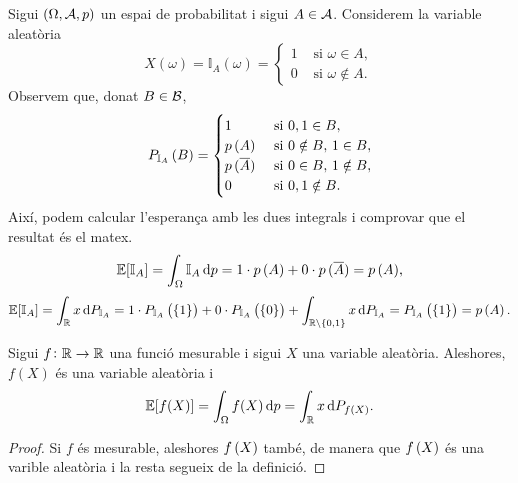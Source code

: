 \begin{example}
    Sigui $\left( \Omega, \mathcal{A}, p\right)$ un espai de probabilitat i sigui $A\in\mathcal{A}$. Considerem la variable aleatòria
    \[
        X(\omega) = \mathbb{I}_A(\omega) = \begin{cases}
        1&\text{ si } \omega\in A, \\
        0&\text{ si } \omega \notin A.
        \end{cases}
    \]
    Observem que, donat $B\in\mathcal{B}$,
    \[
        P_{\mathbb{I}_A}\left( B\right) = \begin{cases}
            1 &\text{ si } 0,1\in B,\\
            p\left( A\right) &\text{ si } 0\notin B,\, 1\in B,\\
            p\,( \overline{A}) &\text{ si } 0\in B,\, 1\notin B,\\
            0 & \text{ si } 0,1\notin B.
        \end{cases}
    \]
    Així, podem calcular l'esperança amb les dues integrals i comprovar que el resultat és el matex.
    \[
        \esp[\mathbb{I}_A] = \int_\Omega{\mathbb{I}_A \dif p} = 1\cdot p\,(A) + 0\cdot p\,(\comp{A}) = p\,(A),
    \]
    \[
        \esp[\mathbb{I}_A] = \int_\real{x\dif P_{\mathbb{I}_A}} = 1\cdot P_{\mathbb{I}_A}\lp\lc 1\rc\rp + 0\cdot P_{\mathbb{I}_A}\lp\lc 0\rc\rp+ \int_{\real\setminus\lc 0,1\rc} x\dif P_{\mathbb{I}_A} = P_{\mathbb{I}_A}\lp\lc 1\rc\rp = p\lp A\rp.
    \]
\end{example}


\begin{prop}
    Sigui $f\colon\mathbb{R}\to\mathbb{R}$ una funció mesurable i sigui $X$ una variable aleatòria. Aleshores, $f(X)$ és una variable aleatòria i
    \[
        \esp[f(X)] = \int_{\Omega}{f(X) \dif p} = \int_\real{x \dif P_{f\lp X\rp}}.
    \]
\end{prop}
\begin{proof}
    Si $f$ és mesurable, aleshores $f\left( X\right)$ també, de manera que $f\left( X\right)$ és una varible aleatòria i la resta segueix de la definició.
\end{proof}

